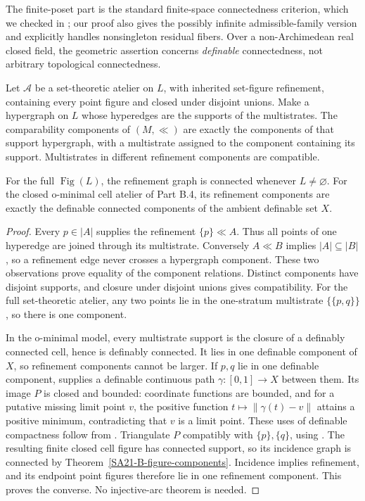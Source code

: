 The finite-poset part is the standard finite-space connectedness
criterion, which we checked in
\citet[Proposition 1.2.4, p.~5]{Barmak2011}; our proof also gives
the possibly infinite admissible-family version and explicitly
handles nonsingleton residual fibers. Over a non-Archimedean real
closed field, the geometric assertion concerns \emph{definable}
connectedness, not arbitrary topological connectedness.

\begin{theorem}
\label{SA21-B-refinement-components}
Let \(\mathscr A\) be a set-theoretic atelier on \(L\), with
inherited set-figure refinement, containing every point figure
and closed under disjoint unions. Make a hypergraph on \(L\)
whose hyperedges are the supports of the multistrates.
The comparability components of \((M,\ll)\) are exactly the
components of that support hypergraph, with a multistrate
assigned to the component containing its support.
Multistrates in different refinement components are compatible.

For the full \(\operatorname{Fig}(L)\), the refinement graph
is connected whenever \(L\ne\varnothing\). For the closed
o-minimal cell atelier of Part B.4, its refinement components
are exactly the definable connected components of the ambient
definable set \(X\).
\end{theorem}

\begin{proof}
Every \(p\in|A|\) supplies the refinement \(\{p\}\ll A\).
Thus all points of one hyperedge are joined through its
multistrate. Conversely \(A\ll B\) implies
\(|A|\subseteq|B|\), so a refinement edge never crosses a
hypergraph component. These two observations prove equality
of the component relations. Distinct components have disjoint
supports, and closure under disjoint unions gives compatibility.
For the full set-theoretic atelier, any two points lie in the
one-stratum multistrate \(\{\{p,q\}\}\), so there is one component.

In the o-minimal model, every multistrate support is the closure
of a definably connected cell, hence is definably connected.
It lies in one definable component of \(X\), so refinement
components cannot be larger. If \(p,q\) lie in one definable
component, \citet[Theorem 3.9, p.~28]{Coste1999} supplies a
definable continuous path \(\gamma:[0,1]\to X\) between them.
Its image \(P\) is closed and bounded: coordinate functions are
bounded, and for a putative missing limit point \(v\), the positive
function \(t\mapsto\|\gamma(t)-v\|\) attains a positive minimum,
contradicting that \(v\) is a limit point. These uses of definable
compactness follow from \citet[Theorem 3.4, pp.~26--27]{Coste1999}.
Triangulate \(P\) compatibly with \(\{p\},\{q\}\), using
\citet[Theorem 4.4, p.~42]{Coste1999}. The resulting finite closed
cell figure has connected support, so its incidence graph is
connected by Theorem~\ref{SA21-B-figure-components}. Incidence
implies refinement, and its endpoint point figures therefore
lie in one refinement component. This proves the converse.
No injective-arc theorem is needed.
\end{proof}

